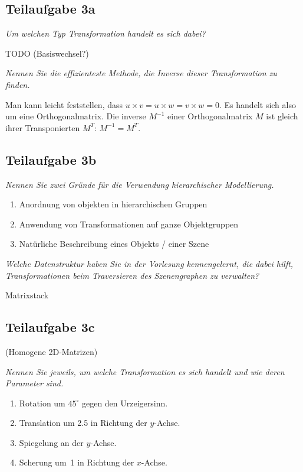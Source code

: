 \documentclass[a4paper]{scrartcl}
\begin{document}
\subsection*{Teilaufgabe 3a}
\textit{Um welchen Typ Transformation handelt es sich dabei?}

TODO (Basiswechsel?)

\textit{Nennen Sie die effizienteste Methode, die Inverse dieser Transformation zu finden.}

Man kann leicht feststellen, dass $u \times v = u \times w = v \times w = 0$.
Es handelt sich also um eine Orthogonalmatrix. Die inverse $M^{-1}$ einer
Orthogonalmatrix $M$ ist gleich ihrer Transponierten $M^T$: $M^{-1} = M^T$.

\subsection*{Teilaufgabe 3b}
\textit{Nennen Sie zwei Gründe für die Verwendung hierarchischer Modellierung.}

\begin{enumerate}[label=(\arabic*)]
    \item Anordnung von objekten in hierarchischen Gruppen
    \item Anwendung von Transformationen auf ganze Objektgruppen
    \item Natürliche Beschreibung eines Objekts / einer Szene
\end{enumerate}

\textit{Welche Datenstruktur haben Sie in der Vorlesung kennengelernt, die dabei hilft,
Transformationen beim Traversieren des Szenengraphen zu verwalten?}

Matrixstack



\subsection*{Teilaufgabe 3c}
(Homogene 2D-Matrizen)

\textit{Nennen Sie jeweils, um welche Transformation es sich handelt und wie deren Parameter sind.}

\begin{enumerate}[label=(\Alph*)]
    \item Rotation um $45^\circ$ gegen den Urzeigersinn.
    \item Translation um 2.5 in Richtung der $y$-Achse.
    \item Spiegelung an der $y$-Achse.
    \item Scherung um~1 in Richtung der $x$-Achse.
\end{enumerate}
\end{document}
